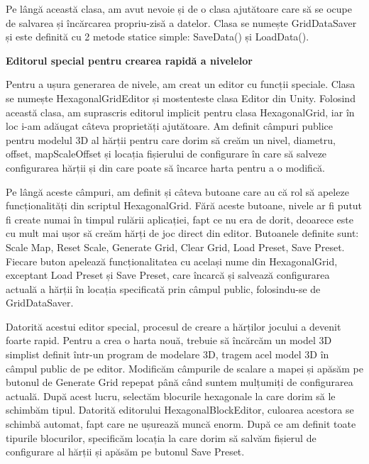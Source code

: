 \documentclass[12pt, a4paper]{article}
\begin{document}
	Pe lângă această clasa, am avut nevoie și de o clasa ajutătoare care să se ocupe de salvarea și încărcarea propriu-zisă a datelor. Clasa se numește GridDataSaver și este definită cu 2 metode statice simple: SaveData() și LoadData().
	\newline
	
	
	
	
	
	\textbf{Editorul special pentru crearea rapidă a nivelelor}
	
	Pentru a ușura generarea de nivele, am creat un editor cu funcții speciale. Clasa se numește HexagonalGridEditor și mostenteste clasa Editor din Unity. Folosind această clasa, am suprascris editorul implicit pentru clasa HexagonalGrid, iar în loc i-am adăugat câteva proprietăți ajutătoare. Am definit câmpuri publice pentru modelul 3D al hărții pentru care dorim să creăm un nivel, diametru, offset, mapScaleOffset și locația fișierului de configurare în care să salveze configurarea hărții și din care poate să încarce harta pentru a o modifică.
	\newline
	
	Pe lângă aceste câmpuri, am definit și câteva butoane care au că rol să apeleze funcționalități din scriptul HexagonalGrid. Fără aceste butoane, nivele ar fi putut fi create numai în timpul rulării aplicației, fapt ce nu era de dorit, deoarece este cu mult mai ușor să creăm hărți de joc direct din editor. Butoanele definite sunt: Scale Map, Reset Scale, Generate Grid, Clear Grid, Load Preset, Save Preset. Fiecare buton apelează funcționalitatea cu același nume din HexagonalGrid, exceptant Load Preset și Save Preset, care încarcă și salvează configurarea actuală a hărții în locația specificată prin câmpul public, folosindu-se de GridDataSaver.
	\newline
	
	Datorită acestui editor special, procesul de creare a hărților jocului a devenit foarte rapid. Pentru a crea o harta nouă, trebuie să încărcăm un model 3D simplist definit într-un program de modelare 3D, tragem acel model 3D în câmpul public de pe editor. Modificăm câmpurile de scalare a mapei și apăsăm pe butonul de Generate Grid repepat până când suntem mulțumiți de configurarea actuală. După acest lucru, selectăm blocurile hexagonale la care dorim să le schimbăm tipul. Datorită editorului HexagonalBlockEditor, culoarea acestora se schimbă automat, fapt care ne ușurează muncă enorm. După ce am definit toate tipurile blocurilor, specificăm locația la care dorim să salvăm fișierul de configurare al hărții și apăsăm pe butonul Save Preset.
	\newline
	
\end{document}

